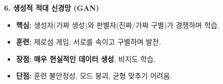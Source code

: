 \documentclass[11pt,a4paper]{article}
\theoremstyle{definition}
\begin{document}
\begin{tcolorbox}[summarybox, title=핵심 개념 요약]
\textbf{6. 생성적 적대 신경망 (GAN)}
\begin{itemize}
    \item \textbf{핵심:} 생성자(가짜 생성)와 판별자(진짜/가짜 구별)가 경쟁하며 학습.
    \item \textbf{훈련:} 제로섬 게임, 서로를 속이고 구별하며 발전.
    \item \textbf{장점:} \textbf{매우 현실적인 데이터 생성}, 비지도 학습.
    \item \textbf{단점:} 훈련 불안정성, 모드 붕괴, 균형 맞추기 어려움.
\end{itemize}
\end{tcolorbox}
\end{document}
